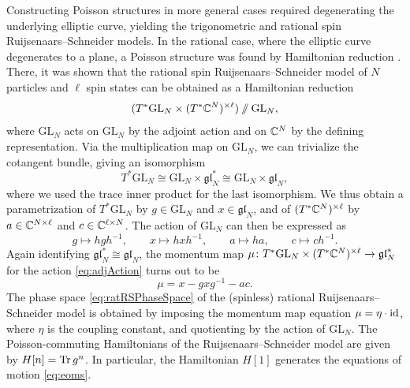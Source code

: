 Constructing Poisson structures in more general cases required degenerating the underlying elliptic curve, yielding the trigonometric and rational spin Ruijsenaars--Schneider models. In the rational case, where the elliptic curve degenerates to a plane, a Poisson structure was found by Hamiltonian reduction \cite{arutyunov_hamiltonian_1998}. There, it was shown that the rational spin Ruijsenaars--Schneider model of $N$ particles and $\ell$ spin states can be obtained as a Hamiltonian reduction
\begin{equation}\label{eq:ratRSPhaseSpace}
	(T^* \mathrm{GL}_N \times (T^* \mathbb{C}^N)^{\times \ell}) \mathbin{/\!\!/} \mathrm{GL}_N,
\end{equation}
where $\mathrm{GL}_N$ acts on $\mathrm{GL}_N$ by the adjoint action and on $\mathbb{C}^N$ by the defining representation. Via the multiplication map on $\mathrm{GL}_N$, we can trivialize the cotangent bundle, giving an isomorphism
\begin{equation}
	T^* \mathrm{GL}_N \cong \mathrm{GL}_N \times \mathfrak{gl}_N^* \cong \mathrm{GL}_N \times \mathfrak{gl}_N,
\end{equation}
where we used the trace inner product for the last isomorphism. We thus obtain a parametrization of $T^* \mathrm{GL}_N$ by $g \in \mathrm{GL}_N$ and $x \in \mathfrak{gl}_N$, and of $(T^* \mathbb{C}^N)^{\times \ell}$ by $a \in \mathbb{C}^{N \times \ell}$ and $c \in \mathbb{C}^{\ell \times N}$. The action of $\mathrm{GL}_N$ can then be expressed as
\begin{equation}\label{eq:adjAction}
	g \mapsto hgh^{-1}, \qquad x \mapsto hxh^{-1}, \qquad a \mapsto ha, \qquad c \mapsto c h^{-1}.
\end{equation}
Again identifying $\mathfrak{gl}_N^* \cong \mathfrak{gl}_N$, the momentum map $\mu\colon T^* \mathrm{GL}_N \times (T^* \mathbb{C}^N)^{\times \ell} \to \mathfrak{gl}_N^*$ for the action \eqref{eq:adjAction} turns out to be
\begin{equation}
	\mu = x - gxg^{-1} - ac.
\end{equation}
The phase space \eqref{eq:ratRSPhaseSpace} of the (spinless) rational Ruijsenaars--Schneider model is obtained by imposing the momentum map equation $\mu = \eta \cdot \textnormal{id}$, where $\eta$ is the coupling constant, and quotienting by the action of $\mathrm{GL}_N$. The Poisson-commuting Hamiltonians of the Ruijsenaars--Schneider model are given by $H[n] = \operatorname{Tr} g^n$. In particular, the Hamiltonian $H[1]$ generates the equations of motion \eqref{eq:eoms}.

